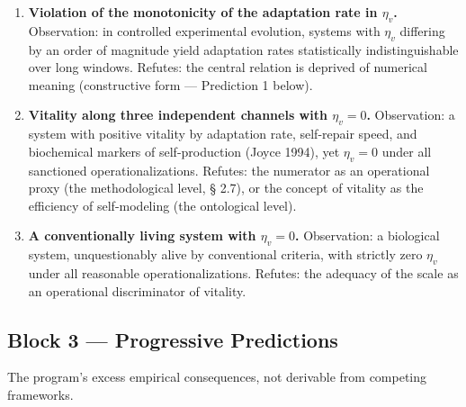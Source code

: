 \documentclass[pdflatex,sn-mathphys-ay]{sn-jnl}
\providecommand{\tightlist}{\setlength{\itemsep}{0pt}\setlength{\parskip}{0pt}}
\begin{document}
\begin{enumerate}
\def\labelenumi{\arabic{enumi}.}
\tightlist
\item
  \textbf{Violation of the monotonicity of the adaptation rate in \(\eta_v\).} Observation: in controlled experimental evolution, systems with \(\eta_v\) differing by an order of magnitude yield adaptation rates statistically indistinguishable over long windows. Refutes: the central relation is deprived of numerical meaning (constructive form --- Prediction 1 below).
\item
  \textbf{Vitality along three independent channels with \(\eta_v = 0\).} Observation: a system with positive vitality by adaptation rate, self-repair speed, and biochemical markers of self-production (Joyce 1994), yet \(\eta_v = 0\) under all sanctioned operationalizations. Refutes: the numerator as an operational proxy (the methodological level, § 2.7), or the concept of vitality as the efficiency of self-modeling (the ontological level).
\item
  \textbf{A conventionally living system with \(\eta_v = 0\).} Observation: a biological system, unquestionably alive by conventional criteria, with strictly zero \(\eta_v\) under all reasonable operationalizations. Refutes: the adequacy of the scale as an operational discriminator of vitality.
\end{enumerate}

\subsection{Block 3 --- Progressive Predictions}\label{block-3-progressive-predictions}

The program's excess empirical consequences, not derivable from competing frameworks.
\end{document}

